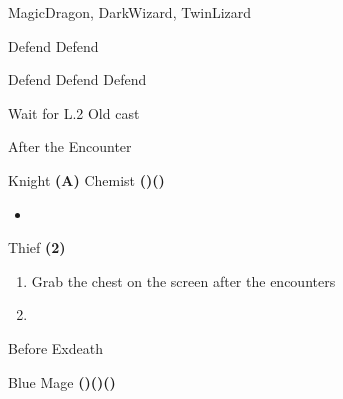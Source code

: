 \begin{paracol}{2}
\begin{encounter}{MagicDragon, DarkWizard, TwinLizard}
	\varwb
	\begin{notes}
		\item {}
		\item {}
	\end{notes}
	\begin{round}{1}
		\bartz \leftCommand{\throw} \then \thunderScroll
        \cara Defend
        \faris Defend
        \lenna \rightCommand{\control} \then {}
	\end{round}
    \begin{round}{2}
		\bartz Defend
        \cara Defend
        \faris Defend
        \lenna \ltwoOld
        \item {}
	\end{round}
    \begin{round}{3}
		\bartz Wait for L.2 Old cast \then \rightCommand{\gilToss}
        \cara \leftCommand{\catch}
	\end{round}
	\varwe
\end{encounter}

\begin{menu}{After the Encounter}
    \varwb
    \begin{jobMenu}
        \lenna Knight \textbf{(A)}
        \bartz Chemist \textbf{(\pointUp)(\pointRight)} \ability{!\gilToss}
        \begin{itemize}
            \item[] \optimize \space \then {}
        \end{itemize}
        \cara Thief \textbf{(2\pointRight)} \ability{!\escape}
    \end{jobMenu}
    \varwe
\end{menu}

\begin{enumerate}[resume]
    \item Grab the  chest on the screen after the encounters
    \item {}
\end{enumerate}

\begin{menu}{Before Exdeath}
    \varwb
    \begin{jobMenu}
        \cara Blue Mage \textbf{(\pointDown)(\pointLeft)(\pointDown)} \ability{\dash} \optimize
    \end{jobMenu}
    \varwe
\end{menu}


\end{paracol}
